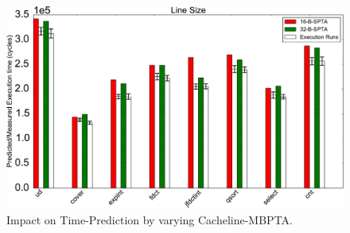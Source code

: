\begin{figure}[tb!]
\centering
\includegraphics[scale=0.4]{figures/cacheline-spta.pdf}
\caption{Impact on Time-Prediction by varying
Cacheline-MBPTA.}
\label{cacheline-spta}
\end{figure}


